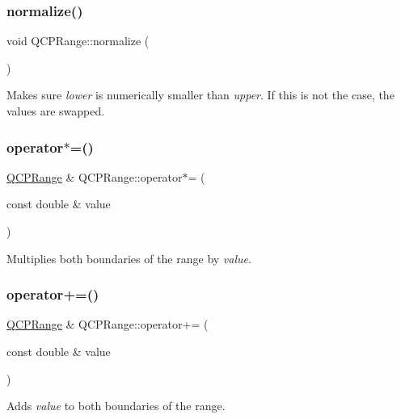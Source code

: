 \subsubsection{\texorpdfstring{normalize()}{normalize()}}
{\footnotesize\ttfamily void Q\+C\+P\+Range\+::normalize (\begin{DoxyParamCaption}{ }\end{DoxyParamCaption})\hspace{0.3cm}{\ttfamily [inline]}}

Makes sure {\itshape lower} is numerically smaller than {\itshape upper}. If this is not the case, the values are swapped. \mbox{\label{classQCPRange_a6876aa9620ff2f0f7f1873f998372cef}} 
\subsubsection{\texorpdfstring{operator$\ast$=()}{operator*=()}}
{\footnotesize\ttfamily \hyperlink{classQCPRange}{Q\+C\+P\+Range} \& Q\+C\+P\+Range\+::operator$\ast$= (\begin{DoxyParamCaption}\item[{const double \&}]{value }\end{DoxyParamCaption})\hspace{0.3cm}{\ttfamily [inline]}}

Multiplies both boundaries of the range by {\itshape value}. \mbox{\label{classQCPRange_afea7c1aa7d08f061cd9bd8832f957df8}} 
\subsubsection{\texorpdfstring{operator+=()}{operator+=()}}
{\footnotesize\ttfamily \hyperlink{classQCPRange}{Q\+C\+P\+Range} \& Q\+C\+P\+Range\+::operator+= (\begin{DoxyParamCaption}\item[{const double \&}]{value }\end{DoxyParamCaption})\hspace{0.3cm}{\ttfamily [inline]}}

Adds {\itshape value} to both boundaries of the range. \mbox{\label{classQCPRange_a95894bcb15a16a75ca564091374e2191}} 
